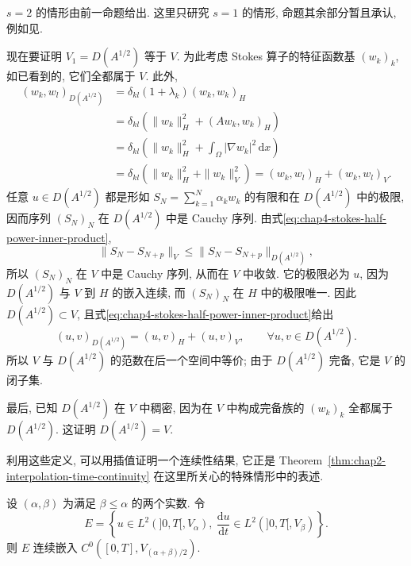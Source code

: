 \begin{Proof}
$s=2$ 的情形由前一命题给出. 这里只研究 $s=1$ 的情形, 命题其余部分暂且承认, 例如见.

现在要证明 $V_1=D(A^{1/2})$ 等于 $V$. 为此考虑 Stokes 算子的特征函数基 $(w_k)_k$, 如已看到的, 它们全都属于 $V$. 此外,
\begin{equation}
 \begin{aligned}
 (w_k,w_l)_{D(A^{1/2})}
 &=\delta_{kl}(1+\lambda_k)(w_k,w_k)_H\\
 &=\delta_{kl}\left(\|w_k\|_H^2+(Aw_k,w_k)_H\right)\\
 &=\delta_{kl}\left(\|w_k\|_H^2+\int_\Omega|\nabla w_k|^2\,\mathrm dx\right)\\
 &=\delta_{kl}\left(\|w_k\|_H^2+\|w_k\|_V^2\right)
  =(w_k,w_l)_H+(w_k,w_l)_V.
 \end{aligned}
 \label{eq:chap4-stokes-half-power-inner-product}
\end{equation}
任意 $u\in D(A^{1/2})$ 都是形如 $S_N=\sum_{k=1}^N\alpha_kw_k$ 的有限和在 $D(A^{1/2})$ 中的极限, 因而序列 $(S_N)_N$ 在 $D(A^{1/2})$ 中是 Cauchy 序列. 由式\eqref{eq:chap4-stokes-half-power-inner-product},
\[
 \|S_N-S_{N+p}\|_V\leq\|S_N-S_{N+p}\|_{D(A^{1/2})},
\]
所以 $(S_N)_N$ 在 $V$ 中是 Cauchy 序列, 从而在 $V$ 中收敛. 它的极限必为 $u$, 因为 $D(A^{1/2})$ 与 $V$ 到 $H$ 的嵌入连续, 而 $(S_N)_N$ 在 $H$ 中的极限唯一. 因此 $D(A^{1/2})\subset V$, 且式\eqref{eq:chap4-stokes-half-power-inner-product}给出
\[
 (u,v)_{D(A^{1/2})}=(u,v)_H+(u,v)_V,
 \qquad\forall u,v\in D(A^{1/2}).
\]
所以 $V$ 与 $D(A^{1/2})$ 的范数在后一个空间中等价; 由于 $D(A^{1/2})$ 完备, 它是 $V$ 的闭子集.

最后, 已知 $D(A^{1/2})$ 在 $V$ 中稠密, 因为在 $V$ 中构成完备族的 $(w_k)_k$ 全都属于 $D(A^{1/2})$. 这证明 $D(A^{1/2})=V$.
\end{Proof}

利用这些定义, 可以用插值证明一个连续性结果, 它正是 Theorem~\ref{thm:chap2-interpolation-time-continuity} 在这里所关心的特殊情形中的表述.

\begin{Theorem}
\label{thm:chap4-stokes-time-continuity}
设 $(\alpha,\beta)$ 为满足 $\beta\leq\alpha$ 的两个实数. 令
\[
 E=\left\{u\in L^2(]0,T[,V_\alpha),\ 
 \frac{\mathrm du}{\mathrm dt}\in L^2(]0,T[,V_\beta)\right\}.
\]
则 $E$ 连续嵌入 $C^0([0,T],V_{(\alpha+\beta)/2})$.
\end{Theorem}

